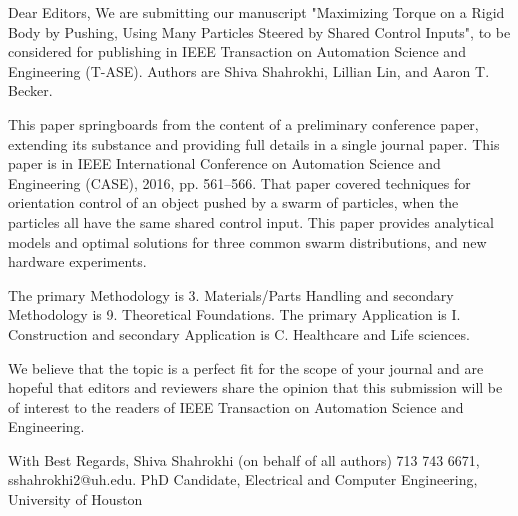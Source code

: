 Dear Editors,
 We are submitting our manuscript "Maximizing Torque on a Rigid Body by Pushing, Using Many Particles Steered by Shared Control Inputs", to be considered for publishing in IEEE Transaction on Automation Science and Engineering  (T-ASE). Authors are Shiva Shahrokhi, Lillian Lin, and Aaron T. Becker.

This paper springboards from the content of a preliminary conference paper, extending its substance and providing full details in a single journal paper. This paper is in IEEE International Conference on Automation Science and Engineering  (CASE), 2016, pp. 561--566. That paper covered techniques for orientation control of an object pushed by a swarm of particles, when the particles all have the same shared control input.
This paper provides analytical models and optimal solutions for three common swarm distributions, and new hardware experiments.

The primary Methodology is 3. Materials/Parts Handling and secondary Methodology is 9. Theoretical Foundations.
The primary Application is I. Construction and secondary Application is C. Healthcare and Life sciences.

We believe that the topic is a perfect fit for the scope of your journal and are hopeful that editors and reviewers share the opinion that this submission will be of interest to the readers of IEEE Transaction on Automation Science and Engineering.

With Best Regards,
Shiva Shahrokhi (on behalf of all authors)
713 743 6671, sshahrokhi2@uh.edu.
PhD Candidate, Electrical and Computer Engineering, University of Houston